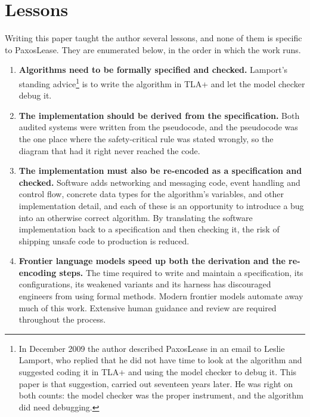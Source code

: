 \documentclass[final,5p,times,twocolumn,number]{elsarticle}
\begin{document}
\section{Lessons}\label{sec:lessons}

Writing this paper taught the author several lessons, and none of them is specific to PaxosLease.  They are enumerated below, in the order in which the work runs.

\begin{enumerate}\itemsep0.25em

\item \textbf{Algorithms need to be formally specified and checked.}  Lamport's standing advice\footnote{In December 2009 the author described PaxosLease in an email to Leslie Lamport, who replied that he did not have time to look at the algorithm and suggested coding it in TLA+ and using the model checker to debug it.  This paper is that suggestion, carried out seventeen years later.  He was right on both counts: the model checker was the proper instrument, and the algorithm did need debugging.} is to write the algorithm in TLA+ and let the model checker debug it.

\item \textbf{The implementation should be derived from the specification.}  Both audited systems were written from the pseudocode, and the pseudocode was the one place where the safety-critical rule was stated wrongly, so the diagram that had it right never reached the code.

\item \textbf{The implementation must also be re-encoded as a specification and checked.}  Software adds networking and messaging code, event handling and control flow, concrete data types for the algorithm's variables, and other implementation detail, and each of these is an opportunity to introduce a bug into an otherwise correct algorithm.  By translating the software implementation back to a specification and then checking it, the risk of shipping unsafe code to production is reduced.

\item \textbf{Frontier language models speed up both the derivation and the re-encoding steps.}  The time required to write and maintain a specification, its configurations, its weakened variants and its harness has discouraged engineers from using formal methods.  Modern frontier models automate away much of this work.  Extensive human guidance and review are required throughout the process.

\end{enumerate}
\end{document}
